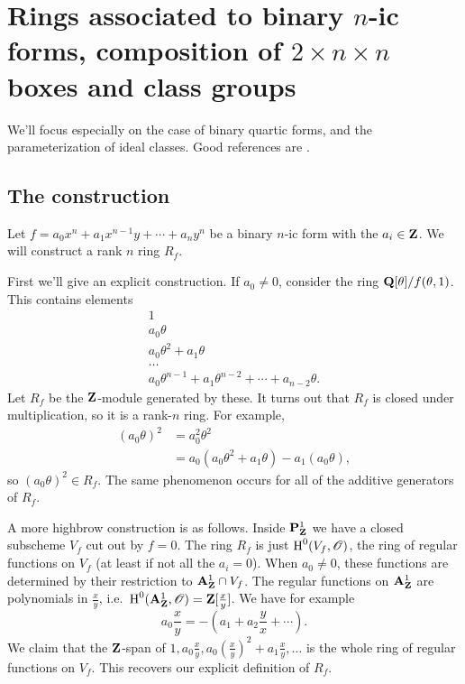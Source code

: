 
\section{Rings associated to binary \texorpdfstring{$n$}{n}-ic forms, composition of \texorpdfstring{$2\times n\times n$}{2*n*n} boxes and class groups}\label{sec:wood-iii}





We'll focus especially on the case of binary quartic forms, and the 
parameterization of ideal classes. Good references are 
\cite{n89,s01,s03,s05,w11-rings}. 






\subsection{The construction}

Let $f=a_0 x^n + a_1 x^{n-1} y + \cdots + a_n y^n$ be a binary $n$-ic form with 
the $a_i\in \mathbf{Z}$. We will construct a rank $n$ ring $R_f$. 

First we'll give an explicit construction. 
If $a_0\ne 0$, consider the ring $\mathbf{Q}[\theta]/f(\theta,1)$. This contains 
elements 
\begin{align*}
  1 \\
  a_0 \theta \\
  a_0 \theta^2 + a_1 \theta \\
  \ldots \\
  a_0 \theta^{n-1} + a_1 \theta^{n-2} + \cdots + a_{n-2} \theta .
\end{align*}
Let $R_f$ be the $\mathbf{Z}$-module generated by these. It turns out that $R_f$ is 
closed under multiplication, so it is a rank-$n$ ring. For example, 
\begin{align*}
  (a_0\theta)^2 
    &= a_0^2 \theta^2 \\
    &= a_0(a_0 \theta^2 + a_1 \theta) - a_1(a_0 \theta) ,
\end{align*}
so $(a_0 \theta)^2\in R_f$. The same phenomenon occurs for all of the additive 
generators of $R_f$. 

A more highbrow construction is as follows. Inside $\mathbf{P}_{\mathbf{Z}}^1$ we have a 
closed subscheme $V_f$ cut out by $f=0$. The ring $R_f$ is just 
$\operatorname{H}^0(V_f,\mathscr{O})$, the ring of regular functions on $V_f$ (at least if not all 
the $a_i=0$). When $a_0\ne 0$, these functions are determined by their 
restriction to $\mathbf{A}_{\mathbf{Z}}^1\cap V_f$. The regular functions on $\mathbf{A}_{\mathbf{Z}}^1$ are 
polynomials in $\frac x y$, i.e.~$\operatorname{H}^0(\mathbf{A}_{\mathbf{Z}}^1,\mathscr{O}) = \mathbf{Z}[\frac x y]$. We 
have for example 
\[
  a_0 \frac x y = -\left(a_1 + a_2 \frac y x + \cdots \right) .
\]
We claim that the $\mathbf{Z}$-span of 
$1,a_0 \frac x y,a_0(\frac x y)^2+a_1 \frac x y,\ldots$ is the whole ring of 
regular functions on $V_f$. This recovers our explicit definition of $R_f$. 

